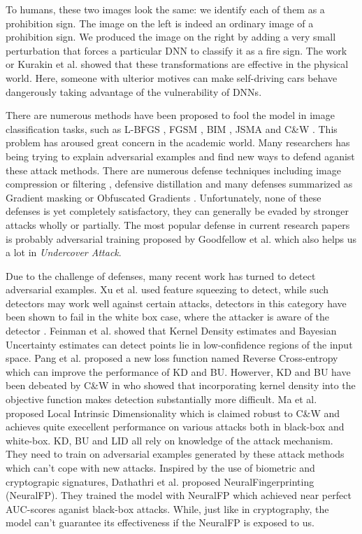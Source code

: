 \documentclass{article}
\begin{document}
To humans, these two images look the same: we identify each of them as a prohibition sign. The image on the left is indeed an ordinary image of a prohibition sign. We produced the image on the right by adding a very small perturbation that forces a particular DNN to classify it as a fire sign. The work or Kurakin et al. \cite{Kurakin2016Adversarial} showed that these transformations are effective in the physical world. Here, someone with ulterior motives can make self-driving cars behave dangerously taking advantage of the vulnerability of DNNs. 

There are numerous methods have been proposed to fool the model in image classification tasks, such as L-BFGS \cite{Szegedy2013Intriguing}, FGSM \cite{Goodfellow2014Explaining}, BIM \cite{Kurakin2016Adversarial}, JSMA \cite{papernot2016the} and C\&W \cite{Carlini2016Towards}. This problem has aroused great concern in the academic world. Many researchers has being trying to explain adversarial examples and find new ways to defend aganist these attack methods. There are numerous defense techniques including image compression or filtering \cite{das2017keeping,xu2018feature}, defensive distillation \cite{papernot2016distillation} and many defenses summarized as Gradient masking \cite{Papernot2016Transferability} or Obfuscated Gradients \cite{athalye2018obfuscated}. Unfortunately, none of these defenses is yet completely satisfactory, they can generally be evaded by stronger attacks wholly or partially. The most popular defense in current research papers is probably adversarial training proposed by Goodfellow et al. \cite{Goodfellow2014Explaining} which also helps us a lot in \emph{Undercover Attack}.

Due to the challenge of defenses, many recent work has turned to detect adversarial examples. Xu et al. used feature squeezing to detect, while such detectors may work well against certain attacks, detectors in this category have been shown to fail in the white box case, where the attacker is aware of the detector \cite{He2017Adversarial}. Feinman et al. \cite{feinman2017detecting} showed that Kernel Density estimates and Bayesian Uncertainty estimates can detect points lie in low-confidence regions of the input space. Pang et al. \cite{pang2018towards} proposed a new loss function named Reverse Cross-entropy which can improve the performance of KD and BU. Howerver, KD and BU have been debeated by C\&W in \cite{carlini2017adversarial} who showed that incorporating kernel density into the objective function makes detection substantially more difficult. Ma et al. \cite{ma2018characterizing} proposed Local Intrinsic Dimensionality which is claimed robust to C\&W and achieves quite execellent performance on various attacks both in black-box and white-box. KD, BU and LID all rely on knowledge of the attack mechanism. They need to train on adversarial examples generated by these attack methods which can't cope with new attacks. Inspired by the use of biometric and cryptograpic signatures, Dathathri et al. \cite{dathathri2018detecting} proposed NeuralFingerprinting (NeuralFP). They trained the model with NeuralFP which achieved near perfect AUC-scores aganist black-box attacks. While, just like in cryptography, the model can't guarantee its effectiveness if the NeuralFP is exposed to us.
\end{document}
